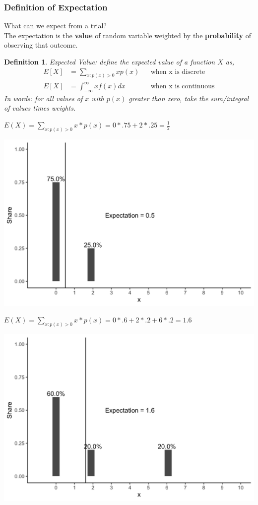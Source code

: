 \documentclass[aspectratio=169, handout]{beamer}
\newtheorem{defn}{Definition}
\numberwithin{equation}{section}
\begin{document}
\begin{frame}
\frametitle{Definition of Expectation}

What can we \alert{expect} from a trial? \pause \\

The expectation is the \textbf{value} of random variable weighted by the \textbf{probability} of observing that outcome.\pause

\begin{defn} 
Expected Value: define the expected value of a function $X$ as, 
\begin{align*}
E[X] &=  \sum_{x:p(x)>0} x p(x) &&\text{when x is discrete} \\ 
E[X] &=  \int_{-\infty}^{\infty} x f(x) dx &&\text{when x is continuous}
\end{align*}
In words: for all values of $x$ with $p(x)$ greater than zero, take the sum/integral of values times weights.
\end{defn} 

\end{frame}




\begin{frame}{$E(X)= \sum_{x:p(x)>0} x *p(x) =0*.75+2*.25= \frac{1}{2}$}

\begin{center}
 \includegraphics[width=3.5 in]{images/plot1.png}
\end{center}

\end{frame}


\begin{frame}{$E(X)= \sum_{x:p(x)>0} x *p(x) =0*.6+2*.2+6*.2= 1.6$}

\begin{center}
\includegraphics[width=3.5 in]{images/plot2.png}
\end{center}

\end{frame}
\end{document}
